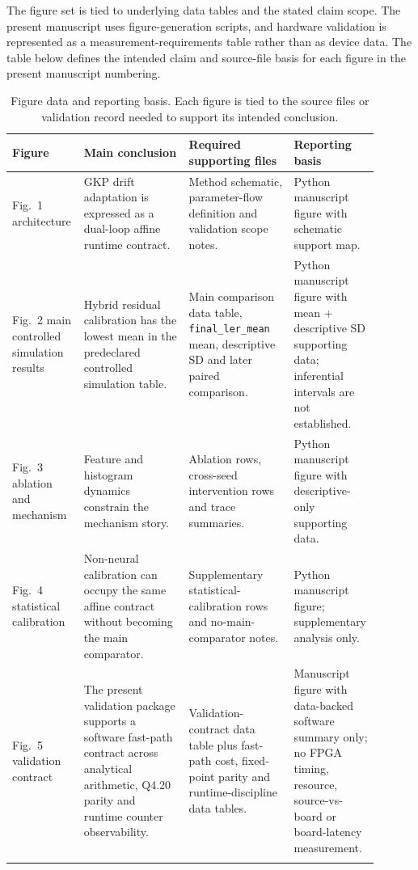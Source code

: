 \documentclass[11pt]{article}
\newcommand{\softwarehil}{controlled simulation}
\newcommand{\finalLER}{\texttt{final\_ler\_mean}}
\begin{document}
The figure set is tied to underlying data tables and the stated claim scope.  The present
manuscript uses figure-generation scripts, and hardware validation is
represented as a measurement-requirements table rather than as device data.  The
table below defines the intended claim and source-file basis for each figure
in the present manuscript numbering.

\begin{table}[htbp]
\centering
\small
\begin{tabular}{@{}>{\raggedright\arraybackslash}p{0.18\linewidth}>{\raggedright\arraybackslash}p{0.29\linewidth}>{\raggedright\arraybackslash}p{0.28\linewidth}>{\raggedright\arraybackslash}p{0.15\linewidth}@{}}
\toprule
Figure & Main conclusion & Required supporting files & Reporting basis \\
\midrule
Fig.~1 architecture & GKP drift adaptation is expressed as a dual-loop affine
runtime contract. & Method schematic, parameter-flow definition and validation
scope notes. & Python manuscript figure with schematic support map. \\
\addlinespace
Fig.~2 main \softwarehil{} results & Hybrid residual calibration has the lowest mean in the
predeclared \softwarehil{} table. & Main comparison data table, \finalLER{} mean,
descriptive SD and later paired comparison. & Python manuscript figure with
mean + descriptive SD supporting data; inferential intervals are not established. \\
\addlinespace
Fig.~3 ablation and mechanism & Feature and histogram dynamics constrain the
mechanism story. & Ablation rows, cross-seed intervention rows and trace
summaries. & Python manuscript figure with descriptive-only supporting data. \\
\addlinespace
Fig.~4 statistical calibration & Non-neural calibration can occupy the same
affine contract without becoming the main comparator. & Supplementary
statistical-calibration rows and no-main-comparator notes. & Python manuscript figure;
supplementary analysis only. \\
\addlinespace
Fig.~5 validation contract & The present validation package supports a software
fast-path contract across analytical arithmetic, Q4.20 parity and runtime
counter observability. & Validation-contract data table plus fast-path cost,
fixed-point parity and runtime-discipline data tables. & Manuscript
figure with data-backed software summary only; no FPGA timing, resource,
source-vs-board or board-latency measurement. \\
\addlinespace
\bottomrule
\end{tabular}
\caption{Figure data and reporting basis.  Each figure is tied to the source
files or validation record needed to support its intended conclusion.}
\label{tab:figure-contract}
\end{table}



\end{document}
